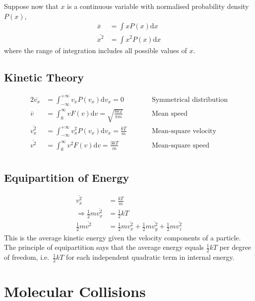\documentclass[british]{article}
\renewcommand{\d}{\mathrm{d}} %
\begin{document}
Suppose now that $x$ is a continuous variable with normalised probability density $P(x)$, 
\begin{align*}
\overline{x} & =\int xP(x)\d{x}\\
\overline{x^{2}} & =\int x^{2}P(x)\d{x}
\end{align*}
where the range of integration includes all possible values of $x$.


\subsection{Kinetic Theory}

\begin{alignat*}{2}
\overline{v_{x}} & =\int_{-\infty}^{+\infty}v_{x}P(v_{x})\d{v_{x}}=0 & \qquad & \text{Symmetrical distribution}\\
\overline{v} & =\int_{0}^{\infty}vF(v)\d{v}=\sqrt{\frac{8kT}{\pi m}} &  & \text{Mean speed}\\
\overline{v_{x}^{2}} & =\int_{-\infty}^{+\infty}v_{x}^{2}P(v_{x})\d{v_{x}}=\frac{kT}{m} &  & \text{Mean-square velocity}\\
\overline{v^{2}} & =\int_{0}^{\infty}v^{2}F(v)\d{v}=\frac{3kT}{m} &  & \text{Mean-square speed}\\
\end{alignat*}



\subsection{Equipartition of Energy}

\begin{align*}
\overline{v_{x}^{2}} & =\frac{kT}{m}\\
\Rightarrow\frac{1}{2}m\overline{v_{x}^{2}} & =\frac{1}{2}kT\\
\frac{1}{2}m\overline{v^{2}} & =\frac{1}{2}m\overline{v_{x}^{2}}+\frac{1}{2}m\overline{v_{y}^{2}}+\frac{1}{2}m\overline{v_{z}^{2}}
\end{align*}
This is the average kinetic energy given the velocity components of a particle. The principle of equipartition says that the average energy equals $\frac{1}{2}kT$ per degree of freedom, i.e.\ $\frac{1}{2}kT$ for each independent quadratic term in internal energy.

\section{Molecular Collisions}
\end{document}
